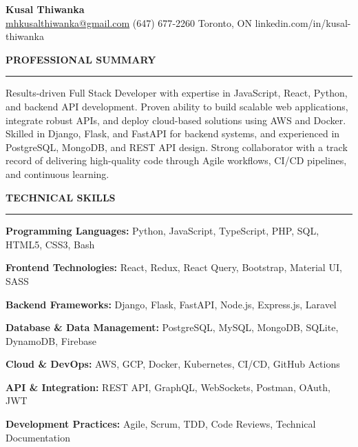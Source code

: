 \documentclass[10pt,letterpaper]{article}
\begin{document}
\begin{center}
{\LARGE\textbf{Kusal Thiwanka}}\\[3pt]
\href{mailto:mhkusalthiwanka@gmail.com}{mhkusalthiwanka@gmail.com}\hspace{2em}%
(647) 677{-}2260\hspace{2em}%
Toronto, ON\hspace{2em}
linkedin.com/in/kusal-thiwanka
\end{center}

\vspace{6pt}

\textbf{PROFESSIONAL SUMMARY}\\[-8pt]
\noindent\rule{\textwidth}{1pt}

\vspace{-2pt}

Results-driven Full Stack Developer with expertise in JavaScript, React, Python, and backend API development. Proven ability to build scalable web applications, integrate robust APIs, and deploy cloud-based solutions using AWS and Docker. Skilled in Django, Flask, and FastAPI for backend systems, and experienced in PostgreSQL, MongoDB, and REST API design. Strong collaborator with a track record of delivering high-quality code through Agile workflows, CI/CD pipelines, and continuous learning.

\vspace{8pt}

\textbf{TECHNICAL SKILLS}\\[-8pt]
\noindent\rule{\textwidth}{1pt}

\vspace{-2pt}

\textbf{Programming Languages:} Python, JavaScript, TypeScript, PHP, SQL, HTML5, CSS3, Bash

\textbf{Frontend Technologies:} React, Redux, React Query, Bootstrap, Material UI, SASS

\textbf{Backend Frameworks:} Django, Flask, FastAPI, Node.js, Express.js, Laravel

\textbf{Database \& Data Management:} PostgreSQL, MySQL, MongoDB, SQLite, DynamoDB, Firebase

\textbf{Cloud \& DevOps:} AWS, GCP, Docker, Kubernetes, CI/CD, GitHub Actions

\textbf{API \& Integration:} REST API, GraphQL, WebSockets, Postman, OAuth, JWT

\textbf{Development Practices:} Agile, Scrum, TDD, Code Reviews, Technical Documentation
\end{document}
